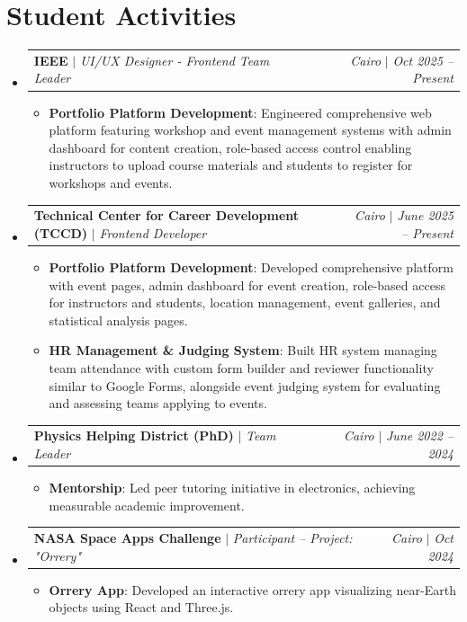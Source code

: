\documentclass[letterpaper,11pt]{article}
\makeatletter
\newcommand{\resumeItem}[2]{\item\small{\textbf{#1}{: #2 \vspace{-2pt}}}}
\newcommand{\resumeActivitySubheading}[4]{
  \vspace{-1pt}\item
    \begin{tabular*}{0.97\textwidth}{l@{\extracolsep{\fill}}r}
      \textbf{#1} $|$ \textit{\small#3} & \textit{\small#2} $|$ \textit{\small #4} \\
    \end{tabular*}\vspace{-5pt}
}
\newcommand{\resumeSubHeadingListStart}{\begin{itemize}[leftmargin=*]}
\newcommand{\resumeSubHeadingListEnd}{\end{itemize}}
\newcommand{\resumeItemListStart}{\begin{itemize}}
\newcommand{\resumeItemListEnd}{\end{itemize}\vspace{-5pt}}
\makeatother
\begin{document}
\section{Student Activities}
  \resumeSubHeadingListStart
    \resumeActivitySubheading
      {IEEE}{Cairo}{UI/UX Designer - Frontend Team Leader}{Oct 2025 -- Present}
      \resumeItemListStart
        \resumeItem{Portfolio Platform Development}
          {Engineered comprehensive web platform featuring workshop and event management systems with admin dashboard for content creation, role-based access control enabling instructors to upload course materials and students to register for workshops and events.}
      \resumeItemListEnd
    \vspace{4pt}
    \resumeActivitySubheading
      {Technical Center for Career Development (TCCD)}{Cairo}{Frontend Developer}{June 2025 -- Present}
      \resumeItemListStart
        \resumeItem{Portfolio Platform Development}
          {Developed comprehensive platform with event pages, admin dashboard for event creation, role-based access for instructors and students, location management, event galleries, and statistical analysis pages.}
        \resumeItem{HR Management \& Judging System}
          {Built HR system managing team attendance with custom form builder and reviewer functionality similar to Google Forms, alongside event judging system for evaluating and assessing teams applying to events.}
      \resumeItemListEnd
    \vspace{4pt}
    \resumeActivitySubheading
      {Physics Helping District (PhD)}{Cairo}{Team Leader}{June 2022 -- 2024}
      \resumeItemListStart
        \resumeItem{Mentorship}
          {Led peer tutoring initiative in electronics, achieving measurable academic improvement.}
      \resumeItemListEnd
    \vspace{4pt}
    \resumeActivitySubheading
      {NASA Space Apps Challenge}{Cairo}{Participant -- Project: "Orrery"}{Oct 2024}
      \resumeItemListStart
        \resumeItem{Orrery App}
          {Developed an interactive orrery app visualizing near-Earth objects using React and Three.js.}
      \resumeItemListEnd
  \resumeSubHeadingListEnd
\end{document}
